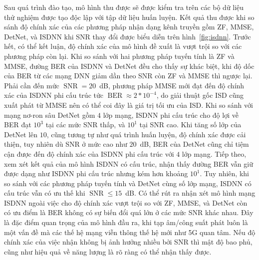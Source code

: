Sau quá trình đào tạo, mô hình thu được sẽ được kiểm tra trên các bộ dữ liệu thử nghiệm được tạo độc lập với tập dữ liệu huấn luyện. Kết quả thu được khi so sánh độ chính xác của các phương pháp nhận dạng kênh truyền gồm ZF, MMSE, DetNet, và ISDNN khi SNR thay đổi được biểu diễn trên hình~\ref{fig:isdnn}. Trước hết, có thể kết luận, độ chính xác của mô hình đề xuất là vượt trội so với các phương pháp còn lại. Khi so sánh với hai phương pháp tuyến tính là ZF và MMSE, đường BER của ISDNN và DetNet đều cho thấy sự khác biệt, khi độ dốc của BER từ các mạng DNN giảm dần theo SNR còn ZF và MMSE thì ngược lại. Phải cần đến mức $\operatorname{SNR}=20$~dB, phương pháp MMSE mới đạt đến độ chính xác của ISDNN phi cấu trúc tức $\operatorname{BER}\approx 2* 10^{-4}$, do giải thuật gốc ISD cũng xuất phát từ MMSE nên có thể coi đây là giá trị tối ưu của ISD. Khi so sánh với mạng nơ-ron sâu DetNet gồm $4$ lớp mạng, ISDNN phi cấu trúc cho độ lợi về BER đạt $10^3$ tại các mức SNR thấp, và $10^1$ tại SNR cao. Khi tăng số lớp của DetNet lên $10$, cũng tương tự như quá trình huấn luyện, độ chính xác được cải thiện, tuy nhiên dù SNR ở mức cao như $20$~dB, BER của DetNet cũng chỉ tiệm cận được đến độ chính xác của ISDNN phi cấu trúc với $4$ lớp mạng. Tiếp theo, xem xét kết quả của mô hình ISDNN có cấu trúc, nhận thấy đường BER vẫn giữ được dạng như ISDNN phi cấu trúc nhưng kém hơn khoảng $10^1$. Tuy nhiên, khi so sánh với các phương pháp tuyến tính và DetNet cùng số lớp mạng, ISDNN có cấu trúc vẫn có ưu thế khi $\operatorname{SNR} \le 15$~dB. Có thể rút ra nhận xét mô hình mạng ISDNN ngoài việc cho độ chính xác vượt trội so với ZF, MMSE, và DetNet còn có ưu điểm là BER không có sự biến đổi quá lớn ở các mức SNR khác nhau. Đây là đặc điểm quan trọng của mô hình đầu ra, khi tạp âm/công suất phát luôn là một vấn đề mà các thế hệ mạng viễn thông thế hệ mới như 5G quan tâm. Nếu độ chính xác của việc nhận không bị ảnh hưởng nhiều bởi SNR thì mật độ bao phủ, cũng như hiệu quả về năng lượng là rõ ràng có thể nhận thấy được.
